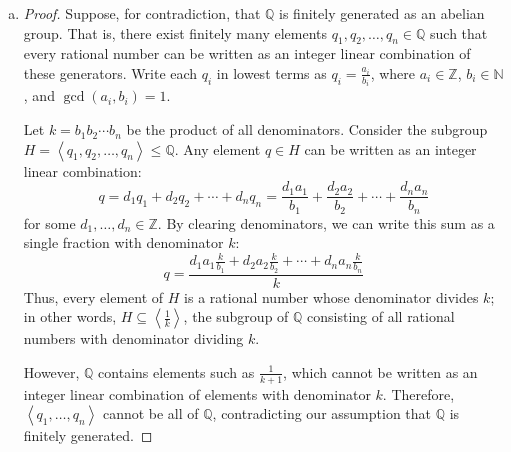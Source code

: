 \documentclass{article}
\def\zz{{\mathbb Z}}
\def\qq{{\mathbb Q}}
\def\nn{{\mathbb N}}
\begin{document}
\begin{enumerate}[(a)]
    \item \begin{proof}
        Suppose, for contradiction, that $\qq$ is finitely generated as an abelian group. That is, there exist finitely many elements $q_1, q_2, \ldots, q_n \in \qq$ such that every rational number can be written as an integer linear combination of these generators. Write each $q_i$ in lowest terms as $q_i = \frac{a_i}{b_i}$, where $a_i \in \zz$, $b_i \in \nn$, and $\gcd(a_i, b_i) = 1$.

        Let $k = b_1 b_2 \cdots b_n$ be the product of all denominators. Consider the subgroup $H = \left\langle q_1, q_2, \ldots, q_n \right\rangle \leq \qq$. Any element $q \in H$ can be written as an integer linear combination:
        \[
        q = d_1 q_1 + d_2 q_2 + \cdots + d_n q_n = \frac{d_1 a_1}{b_1} + \frac{d_2 a_2}{b_2} + \cdots + \frac{d_n a_n}{b_n}
        \]
        for some $d_1, \ldots, d_n \in \zz$. By clearing denominators, we can write this sum as a single fraction with denominator $k$:
        \[
        q = \frac{d_1 a_1 \frac{k}{b_1} + d_2 a_2 \frac{k}{b_2} + \cdots + d_n a_n \frac{k}{b_n}}{k}
        \]
        Thus, every element of $H$ is a rational number whose denominator divides $k$; in other words, $H \subseteq \left\langle \frac{1}{k} \right\rangle$, the subgroup of $\qq$ consisting of all rational numbers with denominator dividing $k$.

        However, $\qq$ contains elements such as $\frac{1}{k+1}$, which cannot be written as an integer linear combination of elements with denominator $k$. Therefore, $\left\langle q_1, \ldots, q_n \right\rangle$ cannot be all of $\qq$, contradicting our assumption that $\qq$ is finitely generated.


\end{proof}
\end{enumerate}
\end{document}
